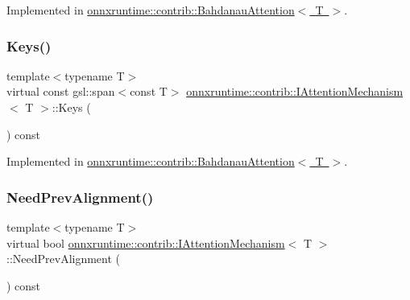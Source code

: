 Implemented in \mbox{\hyperlink{classonnxruntime_1_1contrib_1_1BahdanauAttention_a97cf203e5f792cd85f1213c744ed63e7}{onnxruntime\+::contrib\+::\+Bahdanau\+Attention$<$ T $>$}}.

\mbox{\label{classonnxruntime_1_1contrib_1_1IAttentionMechanism_a87c46bfbbc8debe139ed12e241393381}} 
\subsubsection{\texorpdfstring{Keys()}{Keys()}}
{\footnotesize\ttfamily template$<$typename T$>$ \\
virtual const gsl\+::span$<$const T$>$ \mbox{\hyperlink{classonnxruntime_1_1contrib_1_1IAttentionMechanism}{onnxruntime\+::contrib\+::\+I\+Attention\+Mechanism}}$<$ T $>$\+::Keys (\begin{DoxyParamCaption}{ }\end{DoxyParamCaption}) const\hspace{0.3cm}{\ttfamily [pure virtual]}}



Implemented in \mbox{\hyperlink{classonnxruntime_1_1contrib_1_1BahdanauAttention_afc0509bb32e8e067ebcb7529d7a9c248}{onnxruntime\+::contrib\+::\+Bahdanau\+Attention$<$ T $>$}}.

\mbox{\label{classonnxruntime_1_1contrib_1_1IAttentionMechanism_a4251e6c13e13e5bc1d56fcb9687799b2}} 
\subsubsection{\texorpdfstring{Need\+Prev\+Alignment()}{NeedPrevAlignment()}}
{\footnotesize\ttfamily template$<$typename T$>$ \\
virtual bool \mbox{\hyperlink{classonnxruntime_1_1contrib_1_1IAttentionMechanism}{onnxruntime\+::contrib\+::\+I\+Attention\+Mechanism}}$<$ T $>$\+::Need\+Prev\+Alignment (\begin{DoxyParamCaption}{ }\end{DoxyParamCaption}) const\hspace{0.3cm}{\ttfamily [pure virtual]}}



